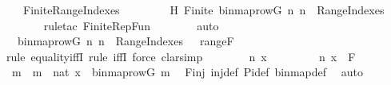 \begin{isabellebody}
\ {\isachardoublequoteopen}{\isasymnot}\ {\isasymnot}\ Finite{\isacharparenleft}{\kern0pt}{\isacharquery}{\kern0pt}RangeIndexes{\isacharparenright}{\kern0pt}{\isachardoublequoteclose}\ \isanewline
\ \ \ \ \isamarkupfalse%
\ \isamarkupfalse%
\ H{\isacharcolon}{\kern0pt}\ {\isachardoublequoteopen}Finite{\isacharparenleft}{\kern0pt}{\isacharbraceleft}{\kern0pt}\ binmap{\isacharunderscore}{\kern0pt}row{\isacharparenleft}{\kern0pt}G{\isacharcomma}{\kern0pt}\ n{\isacharparenright}{\kern0pt}{\isachardot}{\kern0pt}\ n\ {\isasymin}\ {\isacharquery}{\kern0pt}RangeIndexes\ {\isacharbraceright}{\kern0pt}{\isacharparenright}{\kern0pt}{\isachardoublequoteclose}\ \isanewline
\ \ \ \ \ \ \isamarkupfalse%
{\isacharparenleft}{\kern0pt}rule{\isacharunderscore}{\kern0pt}tac\ Finite{\isacharunderscore}{\kern0pt}RepFun{\isacharparenright}{\kern0pt}\isanewline
\ \ \ \ \ \ \isamarkupfalse%
\ auto\isanewline
\ \ \ \ \isamarkupfalse%
\ {\isachardoublequoteopen}{\isacharbraceleft}{\kern0pt}\ binmap{\isacharunderscore}{\kern0pt}row{\isacharparenleft}{\kern0pt}G{\isacharcomma}{\kern0pt}\ n{\isacharparenright}{\kern0pt}{\isachardot}{\kern0pt}\ n\ {\isasymin}\ {\isacharquery}{\kern0pt}RangeIndexes\ {\isacharbraceright}{\kern0pt}\ {\isacharequal}{\kern0pt}\ range{\isacharparenleft}{\kern0pt}F{\isacharparenright}{\kern0pt}{\isachardoublequoteclose}\ \isanewline
\ \ \ \ \isamarkupfalse%
{\isacharparenleft}{\kern0pt}rule\ equality{\isacharunderscore}{\kern0pt}iffI{\isacharcomma}{\kern0pt}\ rule\ iffI{\isacharcomma}{\kern0pt}\ force{\isacharcomma}{\kern0pt}\ clarsimp{\isacharparenright}{\kern0pt}\isanewline
\ \ \ \ \ \ \isamarkupfalse%
\ n\ x\ \isanewline
\ \ \ \ \ \ \isamarkupfalse%
\ {\isachardoublequoteopen}{\isacharless}{\kern0pt}n{\isacharcomma}{\kern0pt}\ x{\isachargreater}{\kern0pt}\ {\isasymin}\ F{\isachardoublequoteclose}\ \isanewline
\ \ \ \ \ \ \isamarkupfalse%
\ \isamarkupfalse%
\ m\ \ {\isachardoublequoteopen}m\ {\isasymin}\ nat{\isachardoublequoteclose}\ {\isachardoublequoteopen}x\ {\isacharequal}{\kern0pt}\ binmap{\isacharunderscore}{\kern0pt}row{\isacharparenleft}{\kern0pt}G{\isacharcomma}{\kern0pt}\ m{\isacharparenright}{\kern0pt}{\isachardoublequoteclose}\ \isamarkupfalse%
\ Finj\ inj{\isacharunderscore}{\kern0pt}def\ Pi{\isacharunderscore}{\kern0pt}def\ binmap{\isacharunderscore}{\kern0pt}def\ \isamarkupfalse%
\ auto\isanewline
\ \ \ \ \ \ \isamarkupfalse%

\end{isabellebody}
